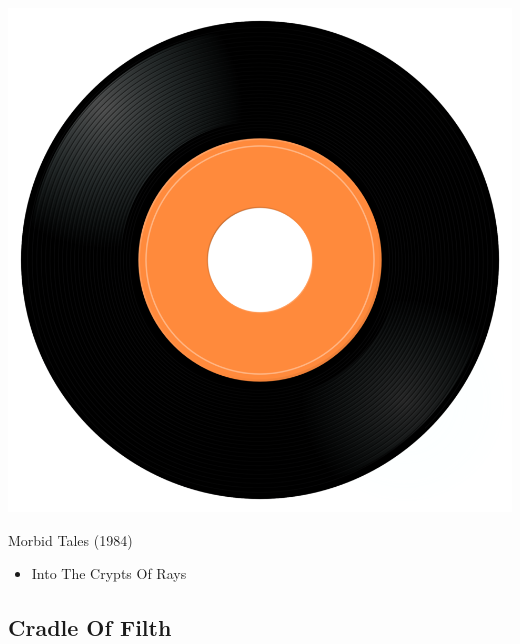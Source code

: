 \begin{minipage}[t]{0.25\textwidth}\vspace{0pt}
\captionsetup{type=figure}
\includegraphics[width=\textwidth]{Images/cover.png}
\caption*{Morbid Tales (1984)}
\end{minipage}
\begin{minipage}[t]{0.25\textwidth}\vspace{0pt}
\begin{itemize}[nosep,leftmargin=1em,labelwidth=*,align=left]
	\setlength{\itemsep}{0pt}
	\item Into The Crypts Of Rays
\end{itemize}
\end{minipage}

\subsection{Cradle Of Filth}

